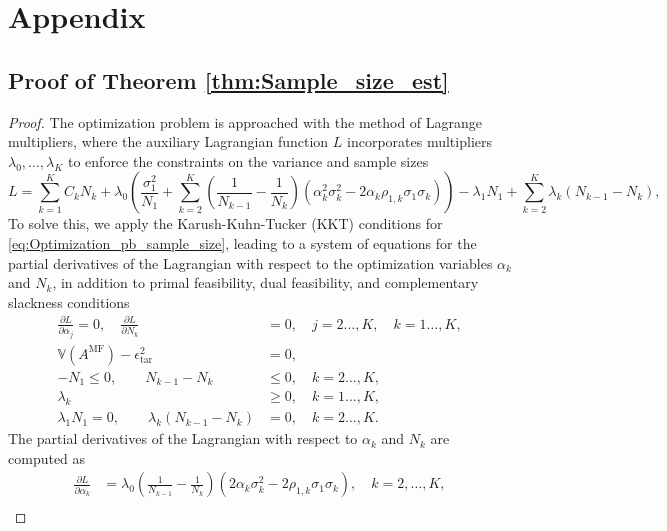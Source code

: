\section{Appendix}\label{sec:Appendix}
\subsection{Proof of Theorem \ref{thm:Sample_size_est}}
\begin{proof}
The optimization problem is approached with the method of Lagrange multipliers, where the auxiliary Lagrangian function $L$ incorporates multipliers $\lambda_0,\ldots, \lambda_K$ to enforce the constraints on the variance and sample sizes
%
\[
L = \sum_{k=1}^K C_kN_k +\lambda_0 \left(\frac{\sigma_1^2}{N_1} + \sum_{k=2}^K \left(\frac{1}{N_{k-1}} - \frac{1}{N_k}\right)\left(\alpha_k^2\sigma_k^2 - 2\alpha_k\rho_{1,k}\sigma_1\sigma_k\right)\right)-\lambda_1 N_1+\sum_{k=2}^K\lambda_k(N_{k-1} - N_k),
\]
%
To solve this, we apply the Karush-Kuhn-Tucker (KKT) conditions for \eqref{eq:Optimization_pb_sample_size}, leading to a system of equations for the partial derivatives of the Lagrangian with respect to the optimization variables $\alpha_k$ and $N_k$,  in addition to  primal feasibility, dual feasibility, and complementary slackness conditions
%
\begin{align*}
\frac{\partial L}{\partial \alpha_j}=0,\quad \frac{\partial L}{\partial N_k}&=0,\quad j=2\ldots,K, \quad k=1\ldots,K,\\
\mathbb{V}\left(A^{\text{MF}}\right)- \epsilon_{\text{tar}}^2 &= 0,\\
   -N_1\le 0,\qquad N_{k-1}-N_k&\le 0, \quad k=2\ldots,K,\\
    \lambda_k &\ge 0,\quad k=1\ldots,K,\\ 
    \lambda_1 N_1=0,\qquad\lambda_k(N_{k-1}-N_k)&=0,\quad k=2\ldots,K.
\end{align*}
%
The partial derivatives of the Lagrangian with respect to $\alpha_k$ and $N_k$ are computed as
%
\begin{align*}
    \frac{\partial L}{\partial \alpha_k}&=\lambda_0\left(\frac{1}{N_{k-1}} - \frac{1}{N_k}\right)\left(2\alpha_k\sigma_k^2 - 2\rho_{1,k}\sigma_1\sigma_k\right),\quad k=2,\dots,K,\\

\end{align*}
\end{proof}
